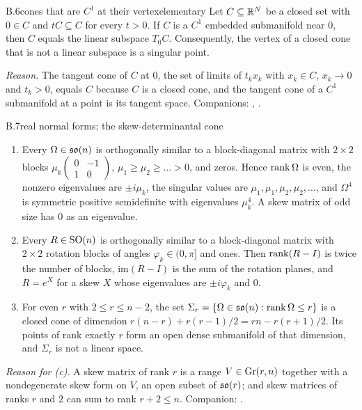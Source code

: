 \begin{auxresult}{B.6}{cones that are $C^1$ at their vertex}{elementary}
Let $C\subseteq\mathbb{R}^N$ be a closed set with $0\in C$ and $tC\subseteq C$ for every $t>0$. If $C$ is a $C^1$ embedded
submanifold near $0$, then $C$ equals the linear subspace $T_0C$. Consequently, the vertex of a closed cone that is not a
linear subspace is a singular point.
\end{auxresult}
\noindent\emph{Reason.} The tangent cone of $C$ at $0$, the set of limits of $t_kx_k$ with $x_k\in C$, $x_k\to0$ and
$t_k>0$, equals $C$ because $C$ is a closed cone, and the tangent cone of a $C^1$ submanifold at a point is its tangent
space. Companions: , .

\begin{auxresult}{B.7}{real normal forms; the skew-determinantal cone}{\citep[Ch.~2]{xhorn2013matrix}}
\begin{enumerate}[label=(\alph*)]
  \item Every $\Omega\in\mathfrak{so}(n)$ is orthogonally similar to a block-diagonal matrix with $2\times2$ blocks
    $\mu_k\left(\begin{smallmatrix}0&-1\\1&0\end{smallmatrix}\right)$, $\mu_1\ge\mu_2\ge\dots>0$, and zeros. Hence
    $\operatorname{rank}\Omega$ is even, the nonzero eigenvalues are $\pm i\mu_k$, the singular values are $\mu_1,\mu_1,\mu_2,\mu_2,\dots$,
    and $\Omega^4$ is symmetric positive semidefinite with eigenvalues $\mu_k^4$. A skew matrix of odd size has $0$ as an
    eigenvalue.
  \item Every $R\in\mathrm{SO}(n)$ is orthogonally similar to a block-diagonal matrix with $2\times2$ rotation blocks of angles
    $\varphi_k\in(0,\pi]$ and ones. Then $\operatorname{rank}(R-I)$ is twice the number of blocks, $\mathrm{im}(R-I)$ is the sum of the
    rotation planes, and $R=e^X$ for a skew $X$ whose eigenvalues are $\pm i\varphi_k$ and $0$.
  \item For even $r$ with $2\le r\le n-2$, the set $\Sigma_r=\{\Omega\in\mathfrak{so}(n):\operatorname{rank}\Omega\le r\}$ is a closed cone of
    dimension $r(n-r)+r(r-1)/2=rn-r(r+1)/2$. Its points of rank exactly $r$ form an open dense submanifold of that
    dimension, and $\Sigma_r$ is not a linear space.
\end{enumerate}
\end{auxresult}
\noindent\emph{Reason for (c).} A skew matrix of rank $r$ is a range $V\in\operatorname{Gr}(r,n)$ together with a nondegenerate skew
form on $V$, an open subset of $\mathfrak{so}(r)$; and skew matrices of ranks $r$ and $2$ can sum to rank $r+2\le n$. Companion:
.

